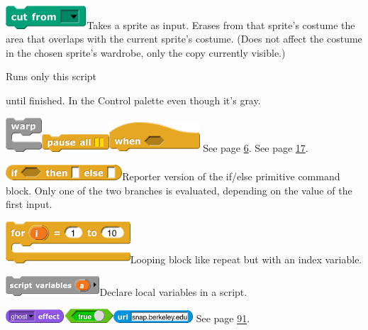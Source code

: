 \includegraphics[width=1.19167in,height=0.33889in]{media/image139.png}Takes
a sprite as input. Erases from that sprite's costume the area that
overlaps with the current sprite's costume. (Does not affect the costume
in the chosen sprite's wardrobe, only the copy currently visible.)

Runs only this script

until finished. In the Control palette even though it's gray.

\includegraphics[width=0.52986in,height=0.5in]{media/image140.png}\includegraphics[width=0.98958in,height=0.25972in]{media/image141.png}\includegraphics[width=1.32986in,height=0.42986in]{media/image142.png}
See page \hyperref[generic_when]{6}. See page \hyperref[pause_all]{17}.

\includegraphics[width=1.71in,height=0.23in]{media/image143.png}Reporter
version of the if/else primitive command block. Only one of the two
branches is evaluated, depending on the value of the first input.

\includegraphics[width=1.83in,height=0.61in]{media/image144.png}Looping
block like repeat but with an index variable.

\includegraphics[width=1.37986in,height=0.28958in]{media/image145.png}Declare
local variables in a script.

\includegraphics[width=0.86in,height=0.19in]{media/image146.png}\includegraphics[width=0.72in,height=0.2in]{media/image147.png}\includegraphics[width=1.17in,height=0.18in]{media/image148.png}
See page \hyperref[url]{91}.

